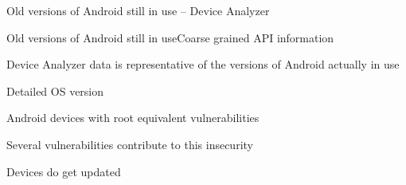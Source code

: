\documentclass{beamer}
\begin{document}
\begin{frame}[plain]{Old versions of Android still in use -- Device Analyzer}{}
 \begin{center}
 \end{center}
\end{frame}

\begin{frame}{Old versions of Android still in use}{Coarse grained API information}
 \begin{center}
  \hspace{-1em}\hspace{-0.5em}
 \end{center}
Device Analyzer data is representative of the versions of Android actually in use
\end{frame}

\begin{frame}[plain]{Detailed OS version}{}
 \begin{center}
  \vspace{-0.5em}
 \end{center}
\end{frame}

\begin{frame}[plain]{Android devices with root equivalent vulnerabilities}{}
 \begin{center}
  \vspace{-0.5em}
 \end{center}
\end{frame}

\begin{frame}[plain]{Several vulnerabilities contribute to this insecurity}{}
 \begin{center}
  \vspace{-0.3em}
 \end{center}
\end{frame}

\begin{frame}[plain]{Devices do get updated}{}
 \begin{center}
  \vspace{-0.2em}
 \end{center}
\end{frame}
\end{document}

